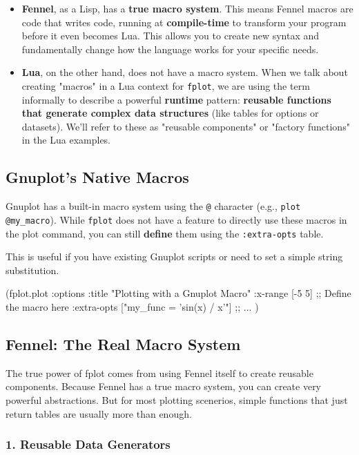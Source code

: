 \documentclass[12pt, letterpaper]{article}
\begin{document}
	\begin{itemize}
		\item \textbf{Fennel}, as a Lisp, has a \textbf{true macro system}. This means Fennel macros are code that writes code, running at \textbf{compile-time} to transform your program before it even becomes Lua. This allows you to create new syntax and fundamentally change how the language works for your specific needs.
		\item \textbf{Lua}, on the other hand, does not have a macro system. When we talk about creating "macros" in a Lua context for \texttt{fplot}, we are using the term informally to describe a powerful \textbf{runtime} pattern: \textbf{reusable functions that generate complex data structures} (like tables for options or datasets). We'll refer to these as "reusable components" or "factory functions" in the Lua examples.
	\end{itemize}
	
	\subsection{Gnuplot's Native Macros}
	
	Gnuplot has a built-in macro system using the \texttt{@} character (e.g., \texttt{plot @my\_macro}). While \texttt{fplot} does not have a feature to directly use these macros in the plot command, you can still \textbf{define} them using the \texttt{:extra-opts} table.
	
	This is useful if you have existing Gnuplot scripts or need to set a simple string substitution.
	
	\begin{fennelcode}
(fplot.plot
{:options {:title "Plotting with a Gnuplot Macro"
		:x-range [-5 5]
		;; Define the macro here
		:extra-opts ["my_func = 'sin(x) / x'"]}
	;; ...
})
	\end{fennelcode}
	
	\subsection{Fennel: The Real Macro System}
	
	The true power of fplot comes from using Fennel itself to create reusable components. Because Fennel has a true macro system, you can create very powerful abstractions. But for most plotting scenerios, simple functions that just return tables are usually more than enough.
	
	\subsubsection*{1. Reusable Data Generators}
	
\end{document}
